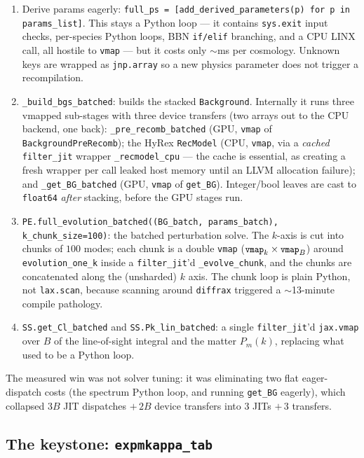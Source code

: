 \documentclass[11pt]{article}
\newcommand{\code}[1]{\texttt{\small #1}}
\begin{document}
\begin{enumerate}[leftmargin=2em,itemsep=2pt]
\item Derive params eagerly: \code{full\_ps = [add\_derived\_parameters(p)
for p in params\_list]}. This stays a Python loop --- it contains
\code{sys.exit} input checks, per-species Python loops, BBN
\code{if/elif} branching, and a CPU LINX call, all hostile to \code{vmap}
--- but it costs only $\sim$ms per cosmology. Unknown keys are wrapped as
\code{jnp.array} so a new physics parameter does not trigger a
recompilation.
\item \code{\_build\_bgs\_batched}: builds the stacked \code{Background}.
Internally it runs three vmapped sub-stages with three device transfers
(two arrays out to the CPU backend, one back):
\code{\_pre\_recomb\_batched} (GPU, \code{vmap} of
\code{BackgroundPreRecomb}); the HyRex \code{RecModel} (CPU, \code{vmap},
via a \emph{cached} \code{filter\_jit} wrapper \code{\_recmodel\_cpu} ---
the cache is essential, as creating a fresh wrapper per call leaked host
memory until an LLVM allocation failure); and \code{\_get\_BG\_batched}
(GPU, \code{vmap} of \code{get\_BG}). Integer/bool leaves are cast to
\code{float64} \emph{after} stacking, before the GPU stages run.
\item \code{PE.full\_evolution\_batched((BG\_batch, params\_batch),
k\_chunk\_size=100)}: the batched perturbation solve. The $k$-axis is cut
into chunks of $100$ modes; each chunk is a double \code{vmap}
($\code{vmap}_{k}\times\code{vmap}_{B}$) around \code{evolution\_one\_k}
inside a \code{filter\_jit}'d \code{\_evolve\_chunk}, and the chunks are
concatenated along the (unsharded) $k$ axis. The chunk loop is plain
Python, not \code{lax.scan}, because scanning around \code{diffrax}
triggered a $\sim$13-minute compile pathology.
\item \code{SS.get\_Cl\_batched} and \code{SS.Pk\_lin\_batched}: a single
\code{filter\_jit}'d \code{jax.vmap} over $B$ of the line-of-sight
integral and the matter $P_m(k)$, replacing what used to be a Python loop.
\end{enumerate}

The measured win was not solver tuning: it was eliminating two
flat eager-dispatch costs (the spectrum Python loop, and running
\code{get\_BG} eagerly), which collapsed $3B$ JIT dispatches $+\,2B$
device transfers into $3$ JITs $+\,3$ transfers.

\subsection{The keystone: \texttt{expmkappa\_tab}}
\label{sec:keystone}
\end{document}
